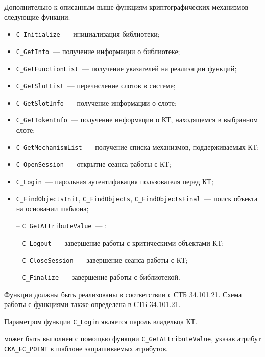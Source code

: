 Дополнительно к описанным выше функциям криптографических механизмов 
 следующие функции:
\begin{itemize}
\item
\verb|C_Initialize|~--- инициализация библиотеки;
\item
\verb|C_GetInfo|~--- получение информации о библиотеке;
\item
\verb|C_GetFunctionList|~--- получение указателей на реализации функций;
\item
\verb|C_GetSlotList|~--- перечисление слотов в системе;
\item
\verb|C_GetSlotInfo|~--- получение информации о слоте;
\item
\verb|C_GetTokenInfo|~--- получение информации о КТ, находящемся в 
выбранном слоте;
\item
\verb|C_GetMechanismList|~--- 
получение списка механизмов, поддерживаемых КТ;
\item
\verb|C_OpenSession|~--- открытие сеанса работы с КТ;
\item
\verb|C_Login|~--- парольная аутентификация пользователя перед КТ;
\item
\verb|C_FindObjectsInit|, \verb|C_FindObjects|, 
\verb|C_FindObjectsFinal|~---
поиск объекта на основании шаблона;
\item[--]
\verb|C_GetAttributeValue|~--- ;
\item[--]
\verb|C_Logout|~--- завершение работы с критическими объектами КТ;
\item[--]
\verb|C_CloseSession|~--- завершение сеанса работы с КТ;
\item[--]
\verb|C_Finalize|~--- завершение работы с библиотекой.
\end{itemize}

Функции должны быть реализованы в соответствии с СТБ 34.101.21.
Схема работы с функциями также определена в СТБ 34.101.21.

Параметром функции \verb|C_Login| является пароль владельца КТ.

 может быть выполнен
с помощью функции \verb|C_GetAttributeValue|, указав атрибут
\verb|CKA_EC_POINT| в шаблоне запрашиваемых атрибутов.

